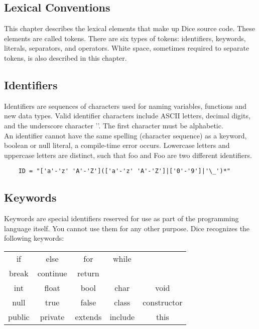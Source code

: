 \begin{homeworkProblem}
	\chapter{Lexical Conventions}
	This chapter describes the lexical elements that make up Dice source code. These elements are called tokens. There are six types of tokens: identifiers, keywords, literals, separators, and operators. White space, sometimes required to separate tokens, is also described in this chapter.
	
	\section{Identifiers}
	Identifiers are sequences of characters used for naming variables, functions and new data types. Valid identifier characters include ASCII letters, decimal digits, and the underscore character '\textunderscore'. The first character must be alphabetic.\\
	An identifier cannot have the same spelling (character sequence) as a keyword, boolean or null literal, a compile-time error occurs. Lowercase letters and uppercase letters are distinct, such that foo and Foo are two different identifiers.
	
	\begin{verbatim}
	ID = "['a'-'z' 'A'-'Z'](['a'-'z' 'A'-'Z']|['0'-'9']|'\_')*"
	\end{verbatim}
	
	\section{Keywords}
	Keywords are special identifiers reserved for use as part of the programming language itself. You cannot use them for any other purpose. Dice recognizes the following keywords:
	
	\begin{center}
		\begin{tabular}{ccccc}
		if & else & for & while \\ 
        break & continue & return \\
		int & float & bool & char & void \\
		null & true & false & class & constructor \\
		public & private & extends & include & this \\
		\end{tabular}
	\end{center}


\end{homeworkProblem}
